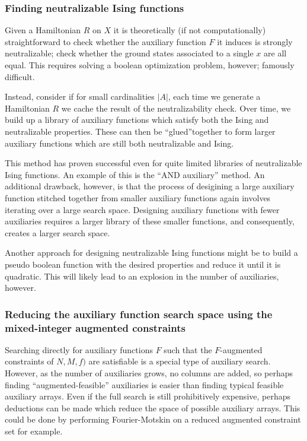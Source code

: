 \documentclass{article}
\begin{document}
\subsubsection{Finding neutralizable Ising functions}

Given a Hamiltonian $R$ on $X$ it is theoretically (if not computationally) straightforward to check whether the auxiliary function $F$ it induces is strongly neutralizable; check whether the ground states associated to a single $x$ are all equal. This requires solving a boolean optimization problem, however; famously difficult.

Instead, consider if for small cardinalities $|A|$, each time we generate a Hamiltonian $R$ we cache the result of the neutralizability check. Over time, we build up a library of auxiliary functions which satisfy both the Ising and neutralizable properties. These can then be ``glued''together to form larger auxiliary functions which are still both neutralizable and Ising.

This method has proven successful even for quite limited libraries of neutralizable Ising functions. An example of this is the ``AND auxiliary'' method. An additional drawback, however, is that the process of desigining a large auxiliary function stitched together from smaller auxiliary functions again involves iterating over a large search space. Designing auxiliary functions with fewer auxiliaries requires a larger library of these smaller functions, and consequently, creates a larger search space.

Another approach for designing neutralizable Ising functions might be to build a pseudo boolean function with the desired properties and reduce it until it is quadratic. This will likely lead to an explosion in the number of auxiliaries, however.

\subsubsection{Reducing the auxiliary function search space using the mixed-integer augmented constraints}

Searching directly for auxiliary functions $F$ such that the $F$-augmented constraints of $N,M,f)$ are satisfiable is a special type of auxiliary search. However, as the number of auxiliaries grows, no columns are added, so perhaps finding ``augmented-feasible'' auxiliaries is easier than finding typical feasible auxiliary arrays. Even if the full search is still prohibitively expensive, perhaps deductions can be made which reduce the space of possible auxiliary arrays. This could be done by performing Fourier-Motskin on a reduced augmented constraint set for example.
\end{document}

